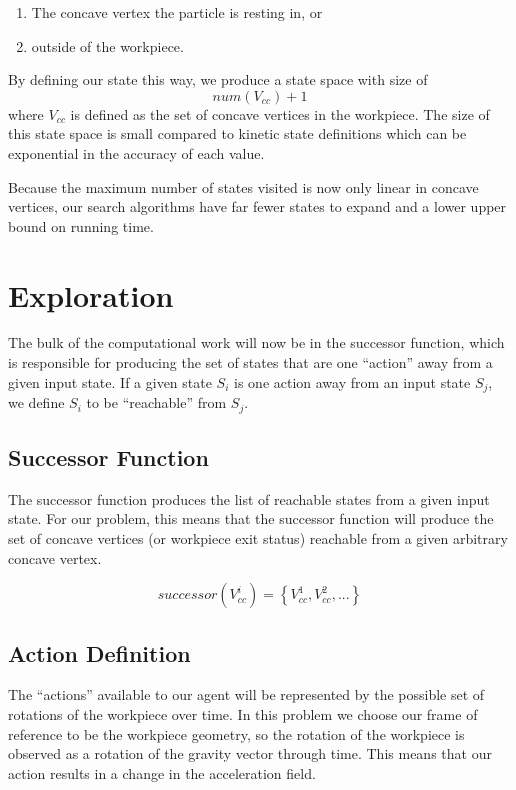 \begin{enumerate}
\item The concave vertex the particle is resting in, or
\item outside of the workpiece.
\end{enumerate}

By defining our state this way, we produce a state space with size of
$$
num(V_{cc}) + 1
$$
where $V_{cc}$ is defined as the set of concave vertices in the workpiece. The size of this state space is small compared to kinetic state definitions which can be exponential in the accuracy of each value.

Because the maximum number of states visited is now only linear in concave vertices, our search algorithms have far fewer states to expand and a lower upper bound on running time.

\section{Exploration}

The bulk of the computational work will now be in the successor function, which is responsible for producing the set of states that are one ``action'' away from a given input state. If a given state $S_i$ is one action away from an input state $S_j$, we define $S_i$ to be ``reachable'' from $S_j$.

	\subsection{Successor Function}

The successor function produces the list of reachable states from a given input state. For our problem, this means that the successor function will produce the set of concave vertices (or workpiece exit status) reachable from a given arbitrary concave vertex.

$$
successor(V_{cc}^{i}) = \left \{ V_{cc}^{1}, V_{cc}^{2}, ...  \right \}
$$

	\subsection{Action Definition}

The ``actions'' available to our agent will be represented by the possible set of rotations of the workpiece over time. In this problem we choose our frame of reference to be the workpiece geometry, so the rotation of the workpiece is observed as a rotation of the gravity vector through time. This means that our action results in a change in the acceleration field.

